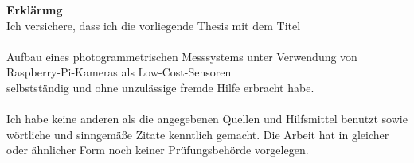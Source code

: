 \documentclass[a4paper,12pt,bibliography=totoc, listof=totoc, titlepage]{scrreprt}
\begin{document}
\clearpage
\thispagestyle{empty}
\noindent\textbf{\large Erklärung}\\
Ich versichere, dass ich die vorliegende Thesis mit dem Titel\\
\\
Aufbau eines photogrammetrischen Messsystems unter Verwendung von Raspberry-Pi-Kameras als Low-Cost-Sensoren
\\
selbstständig und ohne unzulässige fremde Hilfe erbracht habe.\\
\\
Ich habe keine anderen als die angegebenen Quellen und Hilfsmittel benutzt sowie wörtliche und
sinngemäße Zitate kenntlich gemacht. Die Arbeit hat in gleicher oder ähnlicher Form
noch keiner Prüfungsbehörde vorgelegen.
\\
\\
\\
\\
\end{document}
